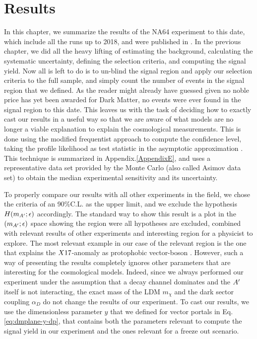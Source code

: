 
\newcommand{\pdirfour}{chapters/plots/chapter4}

\chapter{Results} %

\label{chapter4} %

In this chapter, we summarize the results of the NA64 experiment to this date, which include all the runs up to 2018, and were published in \cite{Banerjee:2020fue,Banerjee:2019hmi,NA64:2019imj,na64-prd,Banerjee:2018vgk,Banerjee:2016tad}. In the previous chapter, we did all the heavy lifting of estimating the background, calculating the systematic uncertainty, defining the selection criteria, and computing the signal yield. Now all is left to do is to un-blind the signal region and apply our selection criteria to the full sample, and simply count the number of events in the signal region that we defined. As the reader might already have guessed given no noble price has yet been awarded for Dark Matter, no events were ever found in the signal region to this date. This leaves us with the task of deciding how to exactly cast our results in a useful way so that we are aware of what models are no longer a viable explanation to explain the cosmological measurements. This is done using the modified frequentist approach to compute the confidence level, taking the profile likelihood as test statistic in the asymptotic approximation \cite{Read_2002,JUNK1999435,Cowan:2010js}. This technique is summarized in Appendix.\ref{AppendixE}, and uses a representative data set provided by the Monte Carlo (also called Asimov data set) to obtain the median experimental sensitivity and its uncertainty.

To properly compare our results with all other experiments in the field, we chose the criteria of an 90\%C.L. as the upper limit, and we exclude the hypothesis $H(m_{A'};\epsilon)$ accordingly. The standard way to show this result is a plot in the $(m_{A'};\epsilon)$ space showing the region were all hypotheses are excluded, combined with relevant results of other experiments and interesting region for a physicist to explore. The most relevant example in our case of the relevant region is the one that explains the $X17$-anomaly as protophobic vector-boson \cite{PhysRevD.95.035017}. However, such a way of presenting the results completely ignores other parameters that are interesting for the cosmological models. Indeed, since we always performed our experiment under the assumption that a decay channel dominates and the $A'$ itself is not interacting, the exact mass of the LDM $m_{\chi}$ and the dark sector coupling $\alpha_D$ do not change the results of our experiment. To cast our results, we use the dimensionless parameter $y$ that we defined for vector portals in Eq.\ref{eq:dmplane-y-dp}, that contains both the parameters relevant to compute the signal yield in our experiment and the ones relevant for a freeze out scenario.

